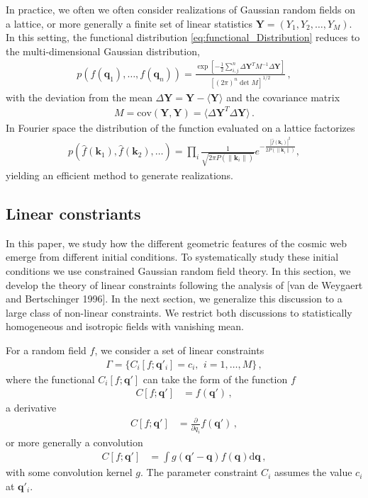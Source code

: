 \documentclass[a4paper, 11pt]{article}
\begin{document}
In practice, we often we often consider realizations of Gaussian random fields on a lattice, or more generally a finite set of linear statistics $\bm{Y}=(Y_1,Y_2,\dots,Y_M)$. In this setting, the functional distribution \eqref{eq:functional_Distribution} reduces to the multi-dimensional Gaussian distribution,
\begin{align}
p(f(\bm{q}_1), \dots, f(\bm{q}_n)) = \frac{\exp\left[-\frac{1}{2} \sum_{i,j}^n \Delta \bm{Y}^T M^{-1} \Delta \bm{Y}\right]}{[(2\pi)^n \det M]^{1/2}}\,,
\end{align}
with the deviation from the mean $\Delta \bm{Y} = \bm{Y} - \langle \bm{Y}\rangle$ and the covariance matrix
\begin{align}
M = \text{cov}(\bm{Y},\bm{Y}) = \langle \Delta \bm{Y}^T \Delta \bm{Y}\rangle\,.
\end{align}
In Fourier space the distribution of the function evaluated on a lattice factorizes
\begin{align}
p(\hat{f}(\bm{k}_1), \hat{f}(\bm{k}_2), \dots) = \prod_{i} \frac{1}{\sqrt{2\pi P(\| \bm{k}_i\|)}} e^{-\frac{|\hat{f}(\bm{k}_i)|^2}{2P(\|\bm{k}_i\|)}},
\end{align}
yielding an efficient method to generate realizations.

\subsection{Linear constriants}
In this paper, we study how the different geometric features of the cosmic web emerge from different initial conditions. To systematically study these initial conditions we use constrained Gaussian random field theory. In this section, we develop the theory of linear constraints following the analysis of [van de Weygaert and Bertschinger 1996]. In the next section, we generalize this discussion to a large class of non-linear constraints. We restrict both discussions to statistically homogeneous and isotropic fields with vanishing mean.

For a random field $f$, we consider a set of linear constraints
\begin{align}
\Gamma =\{ C_i[f;\bm{q}'_i] = c_i,\,\ i=1,\dots,M \}\,,
\end{align}
where the functional $C_i[f;\bm{q}']$ can take the form of the function $f$
\begin{align}
C[f;\bm{q}'] &= f(\bm{q}')\,,
\end{align}
a derivative
\begin{align}
C[f;\bm{q}'] &= \frac{\partial}{\partial q_i}f(\bm{q}')\,,
\end{align}
or more generally a convolution
\begin{align}
C[f;\bm{q}'] &= \int g(\bm{q}' - \bm{q})f(\bm{q})\mathrm{d}\bm{q}\,,
\end{align}
with some convolution kernel $g$. The parameter constraint $C_i$ assumes the value $c_i$ at $\bm{q}'_i$.
\end{document}

